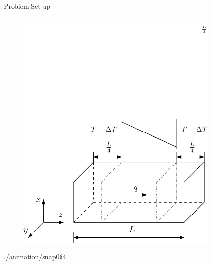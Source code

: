 \documentclass[xcolor={x11names,table},compress,svgnames,mathserif]{beamer}
\renewcommand{\(}{\begin{columns}}
\renewcommand{\)}{\end{columns}}
\newcommand{\<}[1]{\begin{column}{#1}}
\renewcommand{\>}{\end{column}}
\begin{document}
\begin{frame}{Problem Set-up}
\begin{columns}
\begin{column}{0.5\textwidth}
\begin{center}
\begin{figure}[htbp]
        \includegraphics[width=0.9\textwidth]{./Figures/schematic}
\end{figure}
\vspace{3mm}
        {./animation/snap}{0}{64}
\end{center}
\end{column}
\end{columns}

\end{frame}

\end{document}
